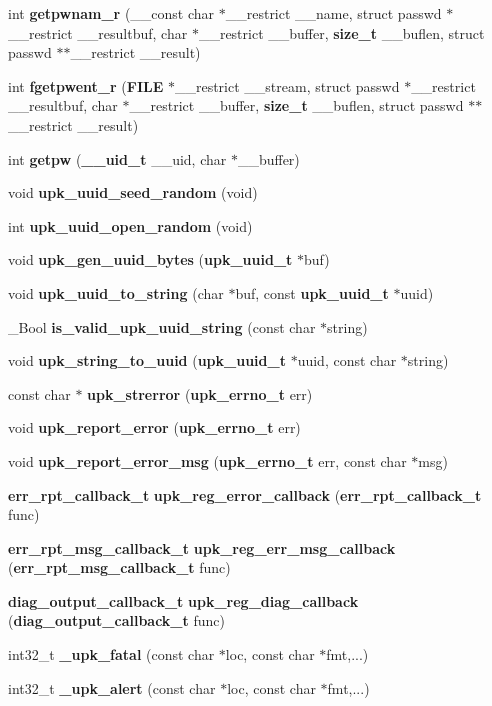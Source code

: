 \begin{DoxyCompactItemize}
\item 
int {\bf getpwnam\_\-r} (\_\-\_\-const char $\ast$\_\-\_\-restrict \_\-\_\-name, struct passwd $\ast$\_\-\_\-restrict \_\-\_\-resultbuf, char $\ast$\_\-\_\-restrict \_\-\_\-buffer, {\bf size\_\-t} \_\-\_\-buflen, struct passwd $\ast$$\ast$\_\-\_\-restrict \_\-\_\-result)
\item 
int {\bf fgetpwent\_\-r} ({\bf FILE} $\ast$\_\-\_\-restrict \_\-\_\-stream, struct passwd $\ast$\_\-\_\-restrict \_\-\_\-resultbuf, char $\ast$\_\-\_\-restrict \_\-\_\-buffer, {\bf size\_\-t} \_\-\_\-buflen, struct passwd $\ast$$\ast$\_\-\_\-restrict \_\-\_\-result)
\item 
int {\bf getpw} ({\bf \_\-\_\-uid\_\-t} \_\-\_\-uid, char $\ast$\_\-\_\-buffer)
\item 
void {\bf upk\_\-uuid\_\-seed\_\-random} (void)
\item 
int {\bf upk\_\-uuid\_\-open\_\-random} (void)
\item 
void {\bf upk\_\-gen\_\-uuid\_\-bytes} ({\bf upk\_\-uuid\_\-t} $\ast$buf)
\item 
void {\bf upk\_\-uuid\_\-to\_\-string} (char $\ast$buf, const {\bf upk\_\-uuid\_\-t} $\ast$uuid)
\item 
\_\-Bool {\bf is\_\-valid\_\-upk\_\-uuid\_\-string} (const char $\ast$string)
\item 
void {\bf upk\_\-string\_\-to\_\-uuid} ({\bf upk\_\-uuid\_\-t} $\ast$uuid, const char $\ast$string)
\item 
const char $\ast$ {\bf upk\_\-strerror} ({\bf upk\_\-errno\_\-t} err)
\item 
void {\bf upk\_\-report\_\-error} ({\bf upk\_\-errno\_\-t} err)
\item 
void {\bf upk\_\-report\_\-error\_\-msg} ({\bf upk\_\-errno\_\-t} err, const char $\ast$msg)
\item 
{\bf err\_\-rpt\_\-callback\_\-t} {\bf upk\_\-reg\_\-error\_\-callback} ({\bf err\_\-rpt\_\-callback\_\-t} func)
\item 
{\bf err\_\-rpt\_\-msg\_\-callback\_\-t} {\bf upk\_\-reg\_\-err\_\-msg\_\-callback} ({\bf err\_\-rpt\_\-msg\_\-callback\_\-t} func)
\item 
{\bf diag\_\-output\_\-callback\_\-t} {\bf upk\_\-reg\_\-diag\_\-callback} ({\bf diag\_\-output\_\-callback\_\-t} func)
\item 
int32\_\-t {\bf \_\-upk\_\-fatal} (const char $\ast$loc, const char $\ast$fmt,...)
\item 
int32\_\-t {\bf \_\-upk\_\-alert} (const char $\ast$loc, const char $\ast$fmt,...)

\end{DoxyCompactItemize}
